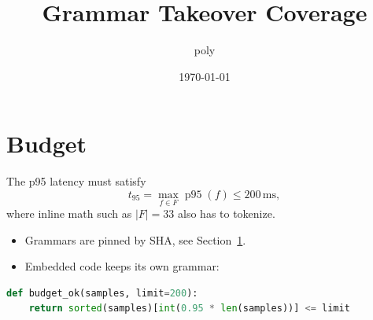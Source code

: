 \documentclass[11pt,a4paper]{article}
\title{Grammar Takeover Coverage}
\author{poly}
\date{\today}
\begin{document}
\maketitle

\section{Budget}
\label{sec:budget}

The p95 latency must satisfy
\begin{equation}
  \label{eq:budget}
  t_{95} = \max_{f \in F} \operatorname{p95}(f) \leq 200\,\mathrm{ms},
\end{equation}
where inline math such as $|F| = 33$ also has to tokenize.

\begin{itemize}
  \item Grammars are pinned by SHA, see Section~\ref{sec:budget}.
  \item Embedded code keeps its own grammar:
\end{itemize}

\begin{lstlisting}[language=Python]
def budget_ok(samples, limit=200):
    return sorted(samples)[int(0.95 * len(samples))] <= limit
\end{lstlisting}


\end{document}
